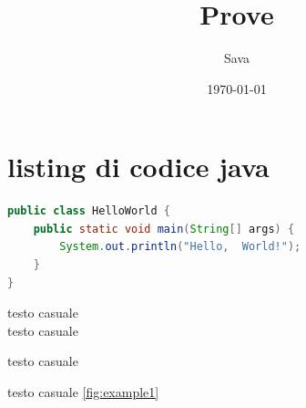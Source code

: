\documentclass[12pt, a4paper]{article}
\title{Prove}
\author{Sava}
\date{\today}
\begin{document}
	\maketitle
	\tableofcontents

	\newpage
	\section{listing di codice java}
	\begin{lstlisting}[language=Java]
public class HelloWorld {
	public static void main(String[] args) {
		System.out.println("Hello,  World!");
	}
}
	\end{lstlisting}	
	
\begin{multicols}{2}
	\centering
	\label{fig:example1}
	
	testo casuale	
	\vspace{10cm}\\testo casuale
	
	\columnbreak
	
	testo casuale
	
	\label{fig:example2}
\end{multicols}
	testo casuale \ref{fig:example1}
\end{document}
